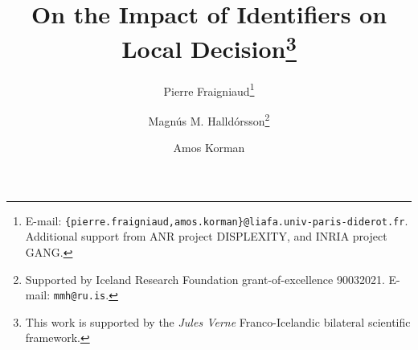 \documentclass{llncs}
\begin{document}
\title{On the Impact of Identifiers on Local Decision\thanks{This work is supported by the \emph{Jules Verne}  Franco-Icelandic bilateral scientific framework.}}

\date{}

\author{
Pierre Fraigniaud\thanks{
E-mail: {\tt \{pierre.fraigniaud,amos.korman\}@liafa.univ-paris-diderot.fr}.
Additional support from  ANR project DISPLEXITY, and INRIA project GANG.}
\and Magn\'us M. Halld\'orsson\thanks{
Supported by Iceland Research Foundation grant-of-excellence 90032021.
E-mail: {\tt mmh@ru.is}.}
\and Amos Korman
}


\maketitle
\end{document}
